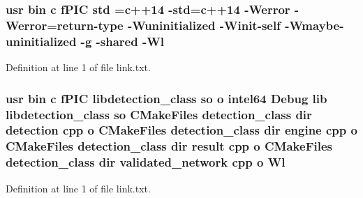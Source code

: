 \subsubsection[{\texorpdfstring{std}{std}}]{\setlength{\rightskip}{0pt plus 5cm}usr bin {\bf c} f\+P\+IC std ={\bf c}++14 -\/std={\bf c}++14 -\/Werror -\/Werror=return-\/type -\/Wuninitialized -\/Winit-\/self -\/Wmaybe-\/uninitialized -\/g -\/shared -\/{\bf Wl}}\hypertarget{common_2detection__class_2CMakeFiles_2detection__class_8dir_2link_8txt_a5f87c8f8e33670f7c8c5221b6be1bcc4}{}\label{common_2detection__class_2CMakeFiles_2detection__class_8dir_2link_8txt_a5f87c8f8e33670f7c8c5221b6be1bcc4}


Definition at line 1 of file link.\+txt.

\subsubsection[{\texorpdfstring{Wl}{Wl}}]{\setlength{\rightskip}{0pt plus 5cm}usr bin {\bf c} f\+P\+IC libdetection\+\_\+class {\bf so} o intel64 Debug lib libdetection\+\_\+class {\bf so} C\+Make\+Files detection\+\_\+class dir detection cpp o C\+Make\+Files detection\+\_\+class dir engine cpp o C\+Make\+Files detection\+\_\+class dir result cpp o C\+Make\+Files detection\+\_\+class dir validated\+\_\+network cpp o Wl}\hypertarget{common_2detection__class_2CMakeFiles_2detection__class_8dir_2link_8txt_a16e5b6a1eb1badb1e1aa75864f169965}{}\label{common_2detection__class_2CMakeFiles_2detection__class_8dir_2link_8txt_a16e5b6a1eb1badb1e1aa75864f169965}


Definition at line 1 of file link.\+txt.

